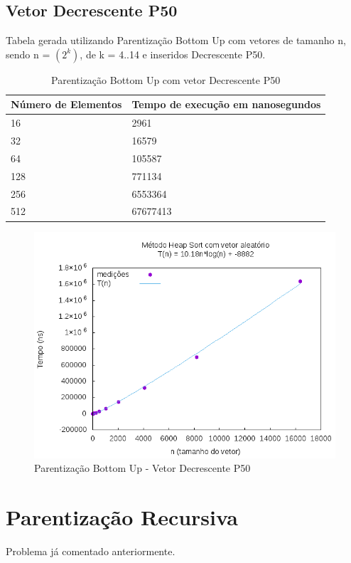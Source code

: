 \documentclass[12pt,a4paper,twoside]{report}
\begin{document}
\subsection{Vetor Decrescente P50}
Tabela gerada utilizando Parentização Bottom Up com vetores de tamanho n, sendo n = $(2^k)$, de k = 4..14 e inseridos Decrescente P50.
\begin{table}[H]
\centering
\caption{Parentização Bottom Up com vetor Decrescente P50}
\label{my-label}
\begin{tabular}{|l|l|}
\hline
\multicolumn{1}{|c|}{\textbf{Número de Elementos}} & \multicolumn{1}{c|}{\textbf{Tempo de execução em nanosegundos}} \\ \hline
16 & 2961 \\ \hline
32 & 16579 \\ \hline
64 & 105587 \\ \hline
128 & 771134 \\ \hline
256 & 6553364 \\ \hline
512 & 67677413 \\ \hline
\end{tabular}
\end{table}

\begin{figure}[H]
    \centering
    \includegraphics[width=0.7\linewidth]{graficos/HeapSort/vIntAleatorio/vIntAleatorio.png}
  \caption{Parentização Bottom Up - Vetor Decrescente P50}
\end{figure}

\section{Parentização Recursiva}

Problema já comentado anteriormente.
\end{document}
